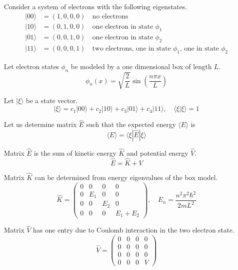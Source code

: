 \documentclass[12pt]{article}
\begin{document}
Consider a system of electrons with the following eigenstates.
\begin{align*}
|00\rangle&=(1,0,0,0)\quad\text{no electrons}\\
|10\rangle&=(0,1,0,0)\quad\text{one electron in state $\phi_1$}\\
|01\rangle&=(0,0,1,0)\quad\text{one electron in state $\phi_2$}\\
|11\rangle&=(0,0,0,1)\quad\text{two electrons, one in state $\phi_1$, one in state $\phi_2$}
\end{align*}

Let electron states $\phi_n$ be modeled by a one dimensional box of length $L$.
\begin{equation*}
\phi_n(x)=\sqrt{\frac{2}{L}}\sin\left(\frac{n\pi x}{L}\right)
\end{equation*}

Let $|\xi\rangle$ be a state vector.
\begin{equation*}
|\xi\rangle=c_1|00\rangle+c_2|10\rangle+c_3|01\rangle+c_4|11\rangle,\quad\langle\xi|\xi\rangle=1
\end{equation*}

Let us determine matrix $\hat{E}$ such that the expected
energy $\langle E \rangle$ is
\begin{equation*}
\langle E\rangle=\langle\xi|\hat{E}|\xi\rangle
\end{equation*}

Matrix $\hat{E}$ is the sum of kinetic energy $\hat K$ and potential energy $\hat V$.
\begin{equation*}
\hat{E}=\hat{K}+\hat{V}
\end{equation*}

Matrix $\hat{K}$ can be determined from energy eigenvalues of the box model.
\begin{equation*}
\hat{K}=\begin{pmatrix}
0 & 0 & 0 & 0\\
0 & E_1 & 0 & 0\\
0 & 0 & E_2 & 0\\
0 & 0 & 0 & E_1+E_2
\end{pmatrix},
\quad
E_n=\frac{n^2\pi^2\hbar^2}{2mL^2}
\end{equation*}

Matrix $\hat{V}$ has one entry due to Coulomb interaction in the two electron state.
\begin{equation*}
\hat{V}=
\begin{pmatrix}
0 & 0 & 0 & 0\\
0 & 0 & 0 & 0\\
0 & 0 & 0 & 0\\
0 & 0 & 0 & V
\end{pmatrix}
\end{equation*}
\end{document}
